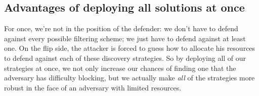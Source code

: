 \documentclass{llncs}
\begin{document}

\subsection{Advantages of deploying all solutions at once}

For once, we're not in the position of the defender: we don't have to
defend against every possible filtering scheme; we just have to defend
against at least one. On the flip side, the attacker is forced to guess
how to allocate his resources to defend against each of these discovery
strategies. So by deploying all of our strategies at once, we not only
increase our chances of finding one that the adversary has difficulty
blocking, but we actually make \emph{all} of the strategies more robust
in the face of an adversary with limited resources.







\end{document}
